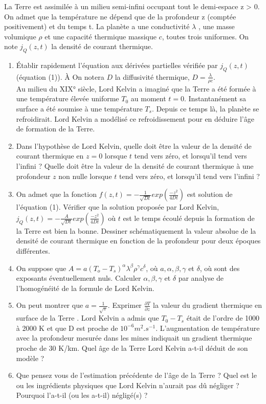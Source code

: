 \documentclass{article}
\begin{document}
La Terre est assimilée à un milieu semi-infini occupant tout le demi-espace z > 0. On admet que la température ne dépend que de la profondeur z (comptée positivement) et du temps t. La planète a une conductivité $\lambda$ , une masse volumique $\rho$ et une capacité thermique massique $c$, toutes trois uniformes. On note $j_Q(z,t)$ la densité de courant thermique. 

\begin{enumerate}
    \item  Établir rapidement l’équation aux dérivées partielles vérifiée par  $j_Q(z,t)$ (équation (1)). À On notera $D$ la diffusivité thermique, $D=\frac{\lambda  } {\rho c}$. 
    \\
Au milieu du XIX° siècle, Lord Kelvin a imaginé que la Terre a été formée à une température élevée uniforme $T_0 $ au moment $t=0$. Instantanément sa surface a été soumise à une température $T_s$. Depuis ce temps là, la planète se refroidirait. Lord Kelvin a modélisé ce refroidissement pour en déduire l’âge de formation de la Terre. 
\item  Dans l’hypothèse de Lord Kelvin, quelle doit être la valeur de la densité de courant thermique en $z = 0$ lorsque $t$ tend vers zéro, et lorsqu’il tend vers l’infini ? Quelle doit être la valeur de la densité de courant thermique à une profondeur $z$ non nulle lorsque $t$ tend vers zéro, et lorsqu’il tend vers l’infini ?
\item On admet que la fonction $f(z,t)= -\frac{1}{\sqrt{D t }}exp ( \frac{-z^2}{4Dt}) $ est solution de l’équation (1).
Vérifier que la solution proposée par Lord Kelvin, $j_Q(z,t)= -\frac{A}{\sqrt{D t }}exp ( \frac{-z^2}{4Dt})$ où $t$ est le
temps écoulé depuis la formation de la Terre est bien la bonne.
Dessiner schématiquement la valeur absolue de la densité de courant thermique en fonction de la profondeur pour deux époques différentes. 
\item On suppose que $A = a(T_o - T_s)^{\alpha}\lambda ^{\beta} \rho ^{\gamma} c^{\delta}$, où $a, \alpha, \beta, \gamma$ et $\delta$, où
sont des exposants éventuellement nuls. Calculer  $ \alpha, \beta, \gamma$ et $\delta$ par analyse de l’homogénéité de la formule de Lord
Kelvin. 
\item On peut montrer que $a=\frac{1}{\sqrt{\pi}}$. Exprimer $\frac{\partial T}{\partial z} $ la valeur du gradient thermique en surface de la
Terre . Lord Kelvin a admis que $T_0 - T_s$ était de l’ordre de 1000 à 2000 K et que D est
proche de $10^{-6} m^2.s^{-1}$. L’augmentation de température avec la profondeur mesurée dans les
mines indiquait un gradient thermique proche de 30 K/km. Quel âge de la Terre Lord Kelvin
a-t-il déduit de son modèle ? 
\item Que pensez vous de l’estimation précédente de l’âge de la Terre ? Quel est le ou les ingrédients physiques que Lord Kelvin n’aurait pas dû négliger ? Pourquoi l’a-t-il (ou les a-t-il)
négligé(s) ?


\end{enumerate}
\end{document}
